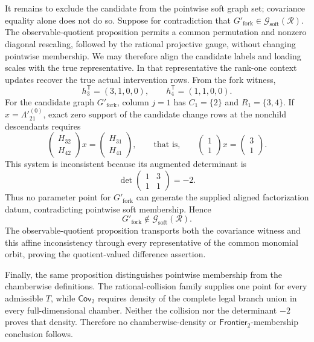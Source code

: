 It remains to exclude the candidate from the pointwise soft graph set; covariance equality alone does not do so.  Suppose for contradiction that \(G'_{\mathrm{fork}}\in\mathcal G_{\mathrm{soft}}(\mathcal R)\).  The observable-quotient proposition permits a common permutation and nonzero diagonal rescaling, followed by the rational projective gauge, without changing pointwise membership.  We may therefore align the candidate labels and loading scales with the true representative.  In that representative the rank-one context updates recover the true actual intervention rows.  From the fork witness,
\[
 h_3^{\mathsf T}=(3,1,0,0),
 \qquad
 h_4^{\mathsf T}=(1,1,0,0).
\]
For the candidate graph \(G'_{\mathrm{fork}}\), column \(j=1\) has \(C_1=\{2\}\) and \(R_1=\{3,4\}\).  If \(x=\Lambda'^{(0)}_{21}\), exact zero support of the candidate change rows at the nonchild descendants requires
\[
 \begin{pmatrix}H_{32}\\H_{42}\end{pmatrix}x
 =\begin{pmatrix}H_{31}\\H_{41}\end{pmatrix},
 \qquad\text{that is,}\qquad
 \begin{pmatrix}1\\1\end{pmatrix}x
 =\begin{pmatrix}3\\1\end{pmatrix}.
\]
This system is inconsistent because its augmented determinant is
\[
 \det\begin{pmatrix}1&3\\1&1\end{pmatrix}=-2.
\]
Thus no parameter point for \(G'_{\mathrm{fork}}\) can generate the supplied aligned factorization datum, contradicting pointwise soft membership.  Hence
\[
 G'_{\mathrm{fork}}\notin\mathcal G_{\mathrm{soft}}(\mathcal R).
\]
The observable-quotient proposition transports both the covariance witness and this affine inconsistency through every representative of the common monomial orbit, proving the quotient-valued difference assertion.

Finally, the same proposition distinguishes pointwise membership from the chamberwise definitions.  The rational-collision family supplies one point for every admissible \(T\), while \(\mathsf{Cov}_2\) requires density of the complete legal branch union in every full-dimensional chamber.  Neither the collision nor the determinant \(-2\) proves that density.  Therefore no chamberwise-density or \(\mathsf{Frontier}_2\)-membership conclusion follows.
